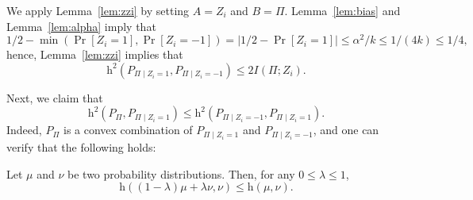 \documentclass[final, 12pt]{colt2018}
\providecommand{\helli}{\mathrm{h}}
\begin{document}
We apply Lemma~\ref{lem:zzi} by setting $A = Z_i$ and $B = \Pi$. Lemma~\ref{lem:bias} and Lemma~\ref{lem:alpha} imply that 
\[ 
1/2 - \min(\Pr[Z_i = 1], \Pr[Z_i=-1]) 
= \left| 1/2 - \Pr[Z_i = 1]  \right| 
\le \alpha^2/k \le 1/(4k) \le 1/4, \]
hence, Lemma~\ref{lem:zzi} implies that
\begin{equation} \label{eq:helinf}
\helli^2(P_{\Pi \mid Z_i = 1}, P_{\Pi \mid Z_i = -1})
\le 2 I(\Pi; Z_i).
\end{equation}



Next, we claim that 
\begin{equation} \label{eq:zonezminus}
\helli^2(P_{\Pi}, P_{\Pi \mid Z_i=1}) \le \helli^2(P_{\Pi \mid Z_i=-1}, P_{\Pi \mid Z_i=1}).
\end{equation}
Indeed, $P_{\Pi}$ is a convex combination of $P_{\Pi \mid Z_i=1}$ and $P_{\Pi \mid Z_i=-1}$, and one can verify that the following holds:

\begin{proposition}
Let $\mu$ and $\nu$ be two probability distributions. Then, for any $0 \le \lambda \le 1$,
\[
\helli((1-\lambda)\mu + \lambda \nu, \nu) \le \helli(\mu, \nu).
\]
\end{proposition}
\end{document}
